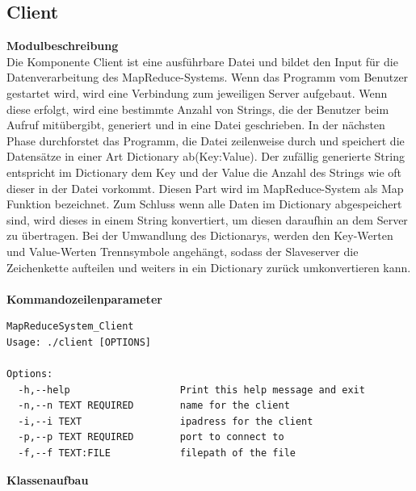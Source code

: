 \documentclass[a4paper,12pt]{article}
\begin{document}
\subsection{Client}
\textbf{Modulbeschreibung}\\
Die Komponente Client ist eine ausführbare Datei und bildet den Input für die Datenverarbeitung des MapReduce-Systems. Wenn das Programm vom Benutzer gestartet wird, wird eine Verbindung zum jeweiligen Server aufgebaut. Wenn diese erfolgt, wird eine bestimmte Anzahl von Strings, 
die der Benutzer beim Aufruf mitübergibt, generiert und in eine Datei geschrieben. In der nächsten Phase durchforstet das Programm, die Datei zeilenweise durch und speichert die Datensätze in einer Art Dictionary ab(Key:Value). Der zufällig generierte String entspricht im Dictionary dem Key und der Value die Anzahl des Strings wie oft dieser in der Datei vorkommt.
Diesen Part wird im MapReduce-System als Map Funktion bezeichnet. Zum Schluss wenn alle Daten im Dictionary abgespeichert sind, wird dieses in einem
String konvertiert, um diesen daraufhin an dem Server zu übertragen. Bei der Umwandlung des Dictionarys, werden den Key-Werten und Value-Werten Trennsymbole angehängt, sodass der Slaveserver die Zeichenkette aufteilen und weiters in ein Dictionary zurück umkonvertieren kann.\\\\
\textbf{Kommandozeilenparameter}\\
\begin{verbatim}
MapReduceSystem_Client
Usage: ./client [OPTIONS]

Options:
  -h,--help                   Print this help message and exit
  -n,--n TEXT REQUIRED        name for the client
  -i,--i TEXT                 ipadress for the client
  -p,--p TEXT REQUIRED        port to connect to
  -f,--f TEXT:FILE            filepath of the file

\end{verbatim}
\newpage
\noindent
\textbf{Klassenaufbau}\\
\end{document}
